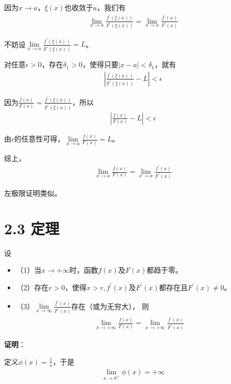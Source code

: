 \documentclass{article}
\begin{document}
因为$x \to a$，$\xi(x)$也收敛于$a$，我们有
\begin{align*}
  \lim\limits_{x \to a} \frac{f^\prime(\xi(x))}{F^\prime(\xi(x))} = \lim\limits_{x \to a} \frac{f^\prime(x)}{F^\prime(x)}
\end{align*}

不妨设$\lim\limits_{x \to a} \frac{f^\prime(\xi(x))}{F^\prime(\xi(x))} = L$。

对任意$\epsilon > 0$，存在$\delta_1 > 0$，使得只要$|x - a| < \delta_1$，就有
\begin{align*}
  |\frac{f^\prime(\xi(x))}{F^\prime(\xi(x))} - L| < \epsilon
\end{align*}

因为$\frac{f(x)}{F(x)} = \frac{f^\prime(\xi(x))}{F^\prime(\xi(x))}$，所以
\begin{align*}
  |\frac{f(x)}{F(x)} - L| < \epsilon
\end{align*}

由$\epsilon$的任意性可得，$\lim\limits_{x \to a} \frac{f(x)}{F(x)} = L$。

综上，
\begin{align*}
  \lim\limits_{x \to a} \frac{f(x)}{F(x)} = \lim\limits_{x \to a} \frac{f^\prime(x)}{F^\prime(x)}
\end{align*}

左极限证明类似。

\section*{2.3 定理}
\begin{zremark}
  设
  \begin{itemize}
    \item （1）当$x \to +\infty$时，函数$f(x)$及$F(x)$都趋于零。
    \item （2）存在$r > 0$，使得$x > r, f^\prime(x)$及$F^\prime(x)$都存在且$F^\prime(x) \not = 0$。
    \item （3）$\lim\limits_{x \to \infty} \frac{f^\prime(x)}{F^\prime(x)}$存在（或为无穷大），
          则
          \begin{align*}
            \lim\limits_{x \to +\infty} \frac{f(x)}{F(x)} = \lim\limits_{x \to +\infty} \frac{f^\prime(x)}{F^\prime(x)}
          \end{align*}
  \end{itemize}
\end{zremark}

\textbf{证明}：

定义$\phi(x) = \frac{1}{x}$，于是
\begin{align*}
  \lim\limits_{x \to 0^{+}} \phi(x) = +\infty
\end{align*}
\end{document}
